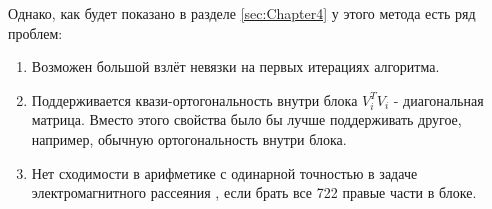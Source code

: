 Однако, как будет показано в разделе \ref{sec:Chapter4} у этого метода есть ряд проблем:
\begin{enumerate}
    \item Возможен большой взлёт невязки на первых итерациях алгоритма.
    \item Поддерживается квази-ортогональность внутри блока $V_i^TV_i$ - диагональная матрица. Вместо этого свойства было бы лучше поддерживать другое, например, обычную ортогональность внутри блока.  
    \item Нет сходимости в арифметике с одинарной точностью в задаче электромагнитного рассеяния \cite{stavtsev2009application}, если брать все 722 правые части в блоке.
\end{enumerate}

\newpage
